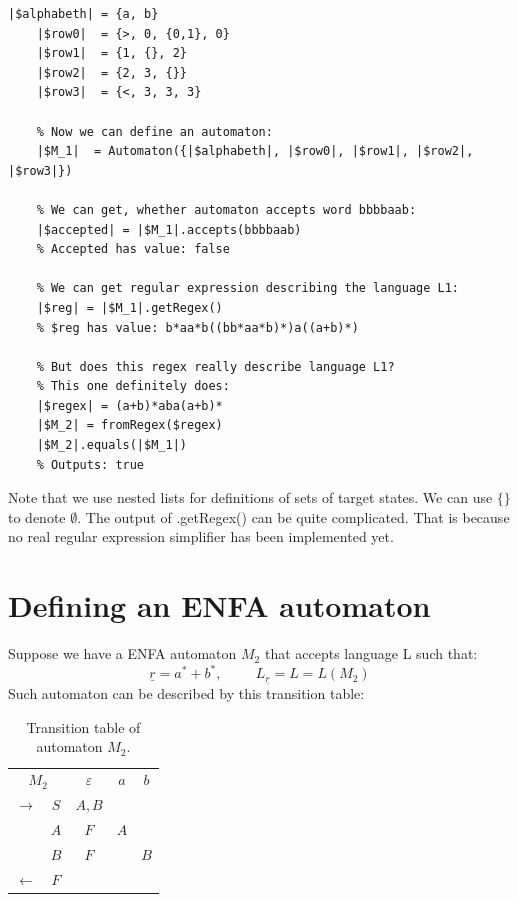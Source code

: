 \documentclass{ctuthesis}
\begin{document}
\begin{minipage}{\linewidth}
\begin{lstlisting}[language = JASL]
	|$alphabeth| = {a, b}
	|$row0|  = {>, 0, {0,1}, 0}
	|$row1|  = {1, {}, 2}
	|$row2|  = {2, 3, {}}
	|$row3|  = {<, 3, 3, 3}
    
	% Now we can define an automaton:
	|$M_1|  = Automaton({|$alphabeth|, |$row0|, |$row1|, |$row2|, |$row3|})

	% We can get, whether automaton accepts word bbbbaab:
	|$accepted| = |$M_1|.accepts(bbbbaab)   
	% Accepted has value: false 
	
	% We can get regular expression describing the language L1:
	|$reg| = |$M_1|.getRegex()
	% $reg has value: b*aa*b((bb*aa*b)*)a((a+b)*) 

	% But does this regex really describe language L1? 
	% This one definitely does:
	|$regex| = (a+b)*aba(a+b)*
	|$M_2| = fromRegex($regex)
	|$M_2|.equals(|$M_1|) 	
	% Outputs: true
\end{lstlisting}
\end{minipage}

Note that we use nested lists for definitions of sets of target states. We can use $\{\}$ to denote $\emptyset$. The output of .getRegex() can be quite complicated. That is because no real regular expression simplifier has been implemented yet.

\section{Defining an ENFA automaton}
\label{sec:example_ENFA}
Suppose we have a ENFA automaton $M_2$ that accepts language L such that:
\begin{equation*}
	\underline{r} = a^*+b^*, \hspace{1cm} L_{\underline{r}} = L = L(M_2) 
\end{equation*}
Such automaton can be described by this transition table:
\begin{table}[H]
\begin{ctucolortab}
\begin{tabular}{cc|ccc}
\multicolumn{2}{c}{$M_2$} & $\varepsilon$ & $a$ & $b$ \\\Midrule
$\rightarrow$ 	& $S$ & $A,B$  \\
				& $A$ & $F$ 	& $A$  \\
				& $B$ & $F$		& & $B$ \\
$\leftarrow$	& $F$ & 		&  
\end{tabular}
\end{ctucolortab}
\caption{Transition table of automaton $M_2$.}
\label{fig:examples_DFA_table}
\end{table} 
\end{document}

